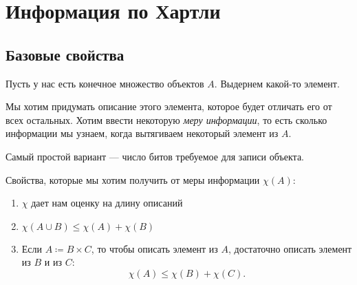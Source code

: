 \chapter{Информация по Хартли}
\section{Базовые свойства}
Пусть у нас есть конечное множество объектов $ A$. Выдернем какой-то элемент.

Мы хотим придумать описание этого элемента, которое будет отличать его от всех остальных. Хотим ввести некоторую \textit{меру информации}, то есть  сколько информации мы узнаем, когда вытягиваем некоторый элемент из $ A$.

Самый простой вариант --- число битов требуемое для записи объекта.

Свойства, которые мы хотим получить от меры информации $ \chi(A)$:
\begin{enumerate}
    \item $ \chi$ дает нам оценку на длину описаний
	\item $ \chi(A \cup B) \le \chi(A) + \chi(B)$
	\item 
Если $ A \coloneqq B \times C$, то чтобы описать элемент из $ A$, достаточно описать элемент из $ B$ и из $ C$:
\[
	\chi(A)  \le \chi(B) + \chi(C)
.\] 
\end{enumerate} 

